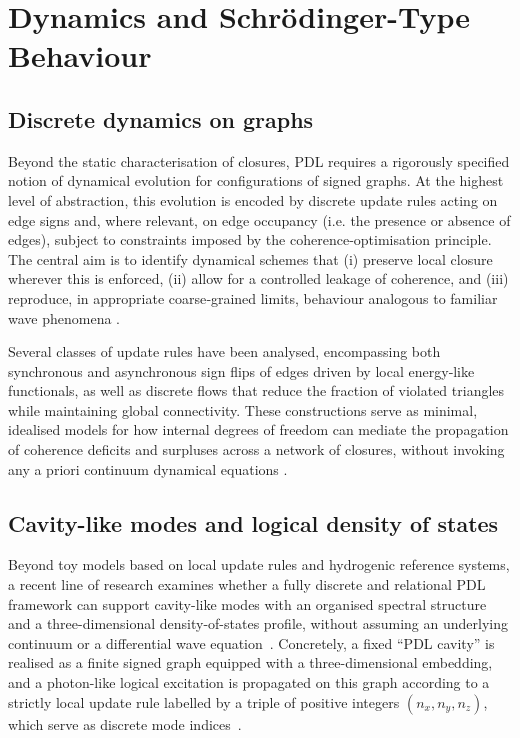 \documentclass{article}
\begin{document}
\section{Dynamics and Schr\"odinger-Type Behaviour}
\label{sec:dynamics}

\subsection{Discrete dynamics on graphs}
\label{subsec:discrete_dynamics}

Beyond the static characterisation of closures, PDL requires a rigorously specified notion of dynamical evolution for configurations of signed graphs. At the highest level of abstraction, this evolution is encoded by discrete update rules acting on edge signs and, where relevant, on edge occupancy (i.e. the presence or absence of edges), subject to constraints imposed by the coherence‑optimisation principle. The central aim is to identify dynamical schemes that (i) preserve local closure wherever this is enforced, (ii) allow for a controlled leakage of coherence, and (iii) reproduce, in appropriate coarse‑grained limits, behaviour analogous to familiar wave phenomena \citep{PDL_Main_2026,PDL_position}.

Several classes of update rules have been analysed, encompassing both synchronous and asynchronous sign flips of edges driven by local energy‑like functionals, as well as discrete flows that reduce the fraction of violated triangles while maintaining global connectivity. These constructions serve as minimal, idealised models for how internal degrees of freedom can mediate the propagation of coherence deficits and surpluses across a network of closures, without invoking any a priori continuum dynamical equations \citep{Coherence_Leakage_18_2026}.

\subsection{Cavity-like modes and logical density of states}
\label{subsec:cavity_modes}

Beyond toy models based on local update rules and hydrogenic reference systems, a recent line of research examines whether a fully discrete and relational PDL framework can support cavity-like modes with an organised spectral structure and a three-dimensional density-of-states profile, without assuming an underlying continuum or a differential wave equation~\citep{Effective_Fields_PDL_2026,PDLCavityModes2026}. Concretely, a fixed “PDL cavity” is realised as a finite signed graph equipped with a three-dimensional embedding, and a photon-like logical excitation is propagated on this graph according to a strictly local update rule labelled by a triple of positive integers $(n_x,n_y,n_z)$, which serve as discrete mode indices~\citep{PDLCavityModes2026}.
\end{document}
